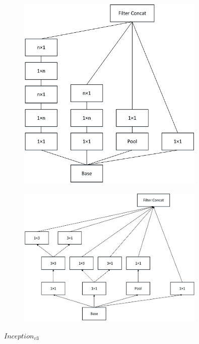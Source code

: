 \begin{figure}
\centering
\includegraphics[width=0.8\textwidth]{./img/ch4/image36.png}
\caption{}
\end{figure}

\begin{figure}
\centering
\includegraphics[width=0.8\textwidth]{./img/ch4/image38.png}
\caption{}
\end{figure}

\(Inception_{v3}\)

